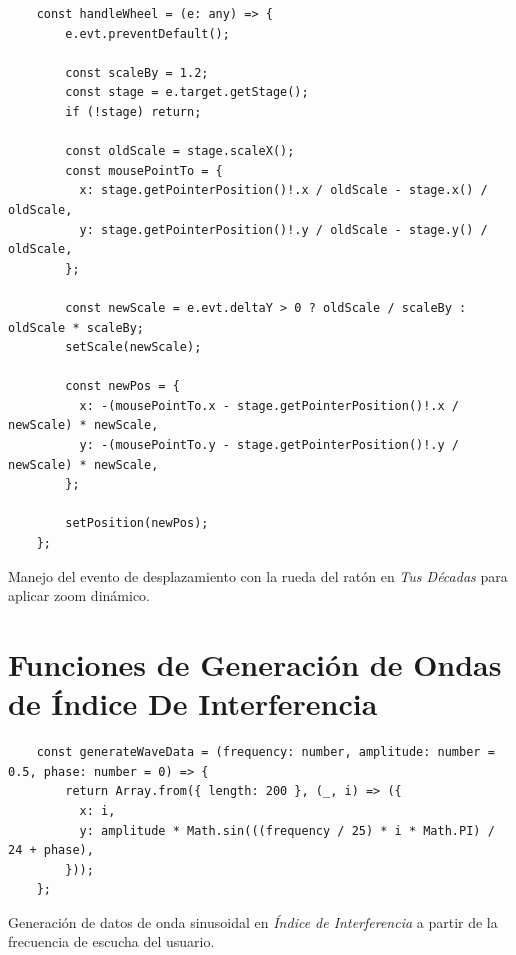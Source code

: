 \begin{ifalgorithm}[H]
  \begin{lstlisting}
    const handleWheel = (e: any) => {
        e.evt.preventDefault();

        const scaleBy = 1.2;
        const stage = e.target.getStage();
        if (!stage) return;

        const oldScale = stage.scaleX();
        const mousePointTo = {
          x: stage.getPointerPosition()!.x / oldScale - stage.x() / oldScale,
          y: stage.getPointerPosition()!.y / oldScale - stage.y() / oldScale,
        };

        const newScale = e.evt.deltaY > 0 ? oldScale / scaleBy : oldScale * scaleBy;
        setScale(newScale);

        const newPos = {
          x: -(mousePointTo.x - stage.getPointerPosition()!.x / newScale) * newScale,
          y: -(mousePointTo.y - stage.getPointerPosition()!.y / newScale) * newScale,
        };

        setPosition(newPos);
    };
    \end{lstlisting}
  \caption{Manejo del evento de desplazamiento con la rueda del ratón en \textit{Tus Décadas} para aplicar zoom dinámico.}
  \label{alg:handle_wheel_tus_decadas}
\end{ifalgorithm}

\section*{Funciones de Generación de Ondas de Índice De Interferencia}

\begin{ifalgorithm}[H]
  \begin{lstlisting}
    const generateWaveData = (frequency: number, amplitude: number = 0.5, phase: number = 0) => {
        return Array.from({ length: 200 }, (_, i) => ({
          x: i,
          y: amplitude * Math.sin(((frequency / 25) * i * Math.PI) / 24 + phase),
        }));
    };
    \end{lstlisting}
  \caption{Generación de datos de onda sinusoidal en \textit{Índice de Interferencia} a partir de la frecuencia de escucha del usuario.}
  \label{alg:generate_wave_data}
\end{ifalgorithm}

